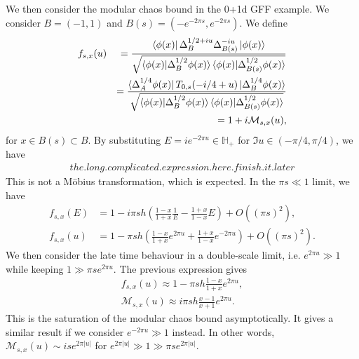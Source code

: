 \documentclass[a4paper,11pt]{article}
\theoremstyle{definition}
\newcommand{\nn}{\nonumber}
\newcommand{\lb}{\left(}
\newcommand{\rb}{\right)}
\newcommand{\mM}{\mathcal{M}}
\begin{document}
We then consider the modular chaos bound in the 0+1d GFF example. We consider $B = (-1,1)$ and $B(s) = (-e^{-2\pi s}, e^{-2\pi s})$. We define
\begin{eqnarray}
    f_{s,x}(u)&&=\frac{\bra{\phi(x)}\Delta_B^{1/2+iu}\Delta_{B(s)}^{-iu}\ket{\phi(x)}}{\sqrt{\braket{\phi(x)|\Delta_B^{1/2}\phi(x)}\braket{\phi(x)|\Delta_{B(s)}^{1/2}\phi(x)}}}\\
    &&=\frac{\bra{\Delta_A^{1/4}\phi(x)} T_{0,s}(-i/4+u)\ket{\Delta_B^{1/4} \phi(x)}}{\sqrt{\braket{\phi(x)|\Delta_B^{1/2}\phi(x)}\braket{\phi(x)|\Delta_{B(s)}^{1/2}\phi(x)}}}\nn\\
    &&=1+i \mathcal{M}_{s,x}(u),
\end{eqnarray}
for $x \in B(s)\subset B$. By substituting $E = ie^{-2\pi u} \in {\mathbb{H}_+}$ for $\Im u \in (-\pi/4,\pi/4)$, we have
\begin{align}
    the.long.complicated.expression.here.finish.it.later
\end{align}
This is not a M\"obius transformation, which is expected. In the $\pi s \ll 1$ limit, we have
\begin{align}
    f_{s,x}(E) &= 1 - i\pi s h\lb \frac{1-x}{1+x}\frac{1}{E} - \frac{1+x}{1-x}E \rb + O((\pi s)^2),\\
    f_{s,x}(u) &= 1 - \pi s h\lb \frac{1-x}{1+x}e^{2\pi u} + \frac{1+x}{1-x}e^{-2\pi u} \rb + O((\pi s)^2).
\end{align}
We then consider the late time behaviour in a double-scale limit, i.e. $e^{2\pi u} \gg1$ while keeping $1\gg\pi se^{2\pi u}$. The previous expression gives
\begin{align} 
    f_{s,x}(u) \approx 1 - \pi s h \frac{1-x}{1+x}e^{2\pi u},\\
    \mM_{s,x}(u)\approx i\pi s h \frac{x-1}{x+1}e^{2\pi u}.
\end{align}
This is the saturation of the modular chaos bound asymptotically. It gives a similar result if we consider $e^{-2\pi u} \gg1$ instead. In other words, $\mM_{s,x}(u) \sim ise^{2\pi |u|}$ for $e^{2\pi |u|} \gg 1\gg\pi se^{2\pi |u|}$.

\end{document}
